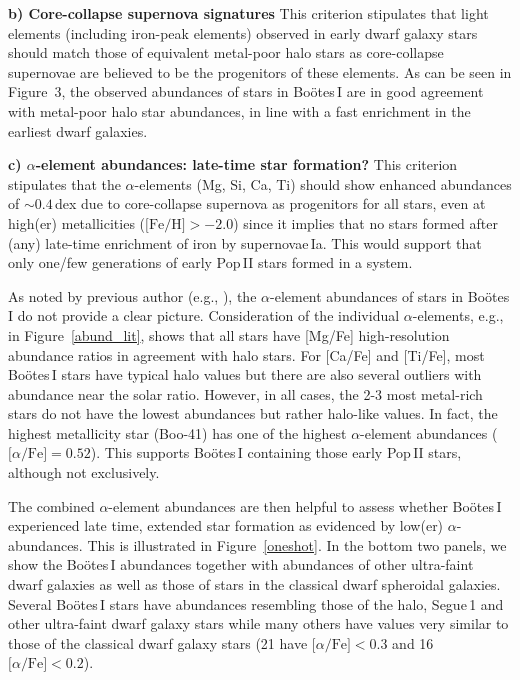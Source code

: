 \documentclass[]{emulateapj}
\begin{document}
\textbf{b) Core-collapse supernova signatures} This criterion
stipulates that light elements (including iron-peak elements) observed
in early dwarf galaxy stars should match those of equivalent
metal-poor halo stars as core-collapse supernovae are believed to be
the progenitors of these elements. As can be seen in Figure~3, the
observed abundances of stars in Bo\"otes\,I are in good agreement with
metal-poor halo star abundances, in line with a fast enrichment in the
earliest dwarf galaxies.



\textbf{c) $\alpha$-element abundances: late-time star formation?}  This
criterion stipulates that the $\alpha$-elements (Mg, Si, Ca, Ti)
should show enhanced abundances of $\sim0.4$\,dex due to core-collapse
supernova as progenitors for all stars, even at high(er) metallicities
($\mbox{[Fe/H]}>-2.0$) since it implies that no stars formed after
(any) late-time enrichment of iron by supernovae\,Ia. This would
support that only one/few generations of early Pop\,II stars formed in
a system.

As noted by previous author (e.g., \citealt{gilmore13}), the
$\alpha$-element abundances of stars in Bo\"otes\,I do not provide a
clear picture. Consideration of the individual $\alpha$-elements,
e.g., in Figure~\ref{abund_lit}, shows that all stars have [Mg/Fe]
high-resolution abundance ratios in agreement with halo stars. For
[Ca/Fe] and [Ti/Fe], most Bo\"otes\,I stars have typical halo values
but there are also several outliers with abundance near the solar
ratio. However, in all cases, the 2-3 most metal-rich stars do not
have the lowest abundances but rather halo-like values. In fact, the
highest metallicity star (Boo-41) has one of the highest
$\alpha$-element abundances ($\mbox{[$\alpha$/Fe]} = 0.52$). This
supports Bo\"otes\,I containing those early Pop\,II stars, although
not exclusively.

The combined $\alpha$-element abundances are then helpful to assess
whether Bo\"otes\,I experienced late time, extended star formation as
evidenced by low(er) $\alpha$-abundances. This is illustrated in
Figure~\ref{oneshot}. In the bottom two panels, we show the
Bo\"otes\,I abundances together with abundances of other ultra-faint
dwarf galaxies as well as those of stars in the classical dwarf
spheroidal galaxies. Several Bo\"otes\,I stars have abundances
resembling those of the halo, Segue\,1 and other ultra-faint dwarf
galaxy stars while many others have values very similar to those of
the classical dwarf galaxy stars (21 have $\mbox{[$\alpha$/Fe]} <
0.3$ and 16 $\mbox{[$\alpha$/Fe]} < 0.2$).
\end{document}
